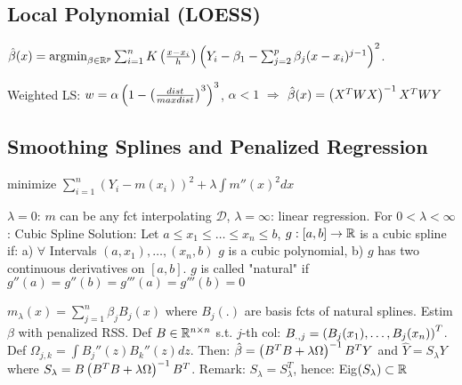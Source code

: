 \vspace{-5pt}

\subsection{Local Polynomial (LOESS)}
$\hat{\beta} (x) = \text{argmin}_{\beta \in \mathbb{R}^p} \sum_{i=1}^n K \left( \frac{x-x_i}{h} \right) \left( Y_i - \beta_1 - \sum_{j=2}^{p} \beta_j (x-x_i)^{j-1} \right)^2$.

Weighted LS: $w = \alpha \left( 1 - \left( \frac{dist}{maxdist} \right)^3 \right)^3$, $\alpha < 1$ $\Rightarrow$ $\hat{\beta}(x) = \left( X^T W X \right)^{-1} X^T W Y$

\vspace{-5pt}

\subsection{Smoothing Splines and Penalized Regression}

 minimize $\sum_{i=1}^n (Y_i - m(x_i))^2 + \lambda \int m''(x)^2 dx$


$\lambda = 0$: $m$ can be any fct interpolating $\mathcal{D}$, $\lambda = \infty$: linear regression.
For $0 < \lambda < \infty$: Cubic Spline Solution: Let $a \leq x_1 \leq \dots \leq x_n \leq b$, $g: [a,b] \rightarrow \mathbb{R}$ is a cubic spline if: a) $\forall$ Intervals $(a,x_1),\dots,(x_n,b)$ $g$ is a cubic polynomial, b) $g$ has two continuous derivatives on $[a,b]$. $g$ is called "natural" if $g''(a) = g''(b) = g'''(a) = g'''(b) = 0$

\vspace{4pt}

$m_\lambda (x) = \sum_{j=1}^n \beta_j B_j (x)$ where $B_j(.)$ are basis fcts of natural splines. Estim $\beta$ with penalized RSS. Def $B \in \mathbb{R}^{n \times n}$ s.t. $j$-th col: $B_{.,j} = \left( B_j (x_1),\dots,B_j(x_n) \right)^T$. Def $\Omega_{j,k} = \int B_j''(z) B_k''(z) dz$. Then: $\hat{\beta} = \left( B^T B + \lambda \Omega \right)^{-1} B^T Y$ and $\hat{Y} = S_\lambda Y$ where $S_\lambda=B\left( B^T B + \lambda \Omega \right)^{-1} B^T$. Remark: $S_\lambda = S_\lambda^T$, hence: Eig$(S_\lambda) \subset \mathbb{R}$

